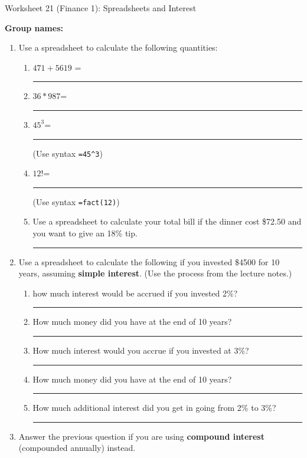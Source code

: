 \documentclass[12pt]{article}
\newcommand{\ans}[1][1in]{\rule{#1}{.5pt}}
\newcommand{\be}{\begin{enumerate}}
\newcommand{\ee}{\end{enumerate}}
\begin{document}
\begin{center}
{\Large  Worksheet 21 (Finance 1): Spreadsheets and Interest}
\end{center}



\noindent \textbf{Group names:} \hrulefill \\



\begin{enumerate}

\item Use a spreadsheet to calculate the following quantities:
\be
\item $471+5619$ = \ans
\item $36*987$= \ans
\item $45^{3}$= \ans (Use syntax \verb`=45^3`)
\item $12!$= \ans (Use syntax \verb`=fact(12)`)
\item Use a spreadsheet to calculate your total bill if the dinner cost \$72.50 and you want to give an 18\% tip. \ans

\ee

\singlespacing

\item Use a spreadsheet to calculate the following if you invested \$4500  for 10 years, assuming {\bf simple interest}.  (Use the process from the lecture notes.)

\doublespacing
\be
\item how much interest would be accrued if you invested 2\%? \ans

\item How much money did you have at the end of 10 years? \ans

\item How much interest would you accrue if you invested at 3\%? \ans

\item How much money did you have at the end of 10 years? \ans

\item How much additional interest did you get in going from 2\% to 3\%? \ans

\ee

\singlespacing
\item Answer the previous question if you are using {\bf compound interest} (compounded annually) instead.


\end{enumerate}
\end{document}
